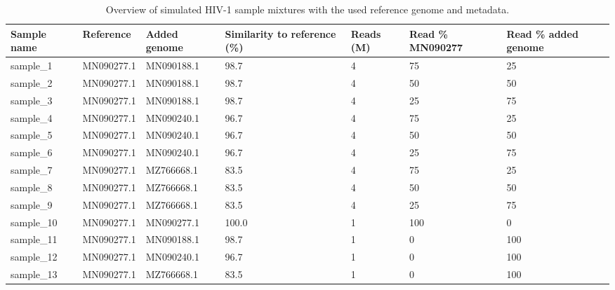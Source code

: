 \newpage

\begin{table}[!htbp]
\centering
\caption{Overview of simulated HIV-1 sample mixtures with the used reference genome and metadata.}
\label{table:S2}
\footnotesize
\begin{adjustbox}{width=\textwidth,center}
\begin{tabular}{llp{2.5cm}p{2.5cm}p{1.5cm}p{2cm}p{2.5cm}}
\toprule
\textbf{Sample name} & \textbf{Reference} & \textbf{Added genome} & \textbf{Similarity to reference (\%)} & \textbf{Reads (M)} & \textbf{Read \% MN090277} & \textbf{Read \% added genome} \\
\midrule
sample\_1 & MN090277.1 & MN090188.1 & 98.7 & 4 & 75 & 25 \\
sample\_2 & MN090277.1 & MN090188.1 & 98.7 & 4 & 50 & 50 \\
sample\_3 & MN090277.1 & MN090188.1 & 98.7 & 4 & 25 & 75 \\
\cmidrule{1-7}
sample\_4 & MN090277.1 & MN090240.1 & 96.7 & 4 & 75 & 25 \\
sample\_5 & MN090277.1 & MN090240.1 & 96.7 & 4 & 50 & 50 \\
sample\_6 & MN090277.1 & MN090240.1 & 96.7 & 4 & 25 & 75 \\
\cmidrule{1-7}
sample\_7 & MN090277.1 & MZ766668.1 & 83.5 & 4 & 75 & 25 \\
sample\_8 & MN090277.1 & MZ766668.1 & 83.5 & 4 & 50 & 50 \\
sample\_9 & MN090277.1 & MZ766668.1 & 83.5 & 4 & 25 & 75 \\
\cmidrule{1-7}
sample\_10 & MN090277.1 & MN090277.1 & 100.0 & 1 & 100 & 0 \\
sample\_11 & MN090277.1 & MN090188.1 & 98.7 & 1 & 0 & 100 \\
sample\_12 & MN090277.1 & MN090240.1 & 96.7 & 1 & 0 & 100 \\
sample\_13 & MN090277.1 & MZ766668.1 & 83.5 & 1 & 0 & 100 \\
\bottomrule
\end{tabular}
\end{adjustbox}
\end{table}
\newpage